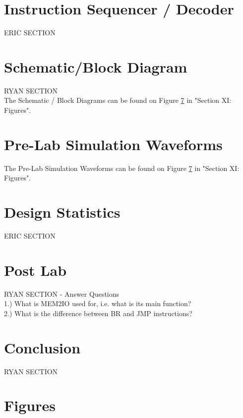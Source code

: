 \documentclass[journal, twocolumn, final,11pt,letterpaper]{IEEEtran}
\begin{document}
\section{Instruction Sequencer / Decoder}
ERIC SECTION 

\section{Schematic/Block Diagram}
RYAN SECTION\\

The Schematic / Block Diagrams can be found on Figure \ref{} in "Section XI: Figures".

\section{Pre-Lab Simulation Waveforms}
The Pre-Lab Simulation Waveforms can be found on Figure \ref{} in "Section XI: Figures".

\section{Design Statistics}
ERIC SECTION

\section{Post Lab}
RYAN SECTION - Answer Questions \\

1.) What is MEM2IO used for, i.e. what is its main function? \\

2.) What is the difference between BR and JMP instructions?\\

\section{Conclusion}
RYAN SECTION

\clearpage
\onecolumn
\section{Figures}
\end{document}
